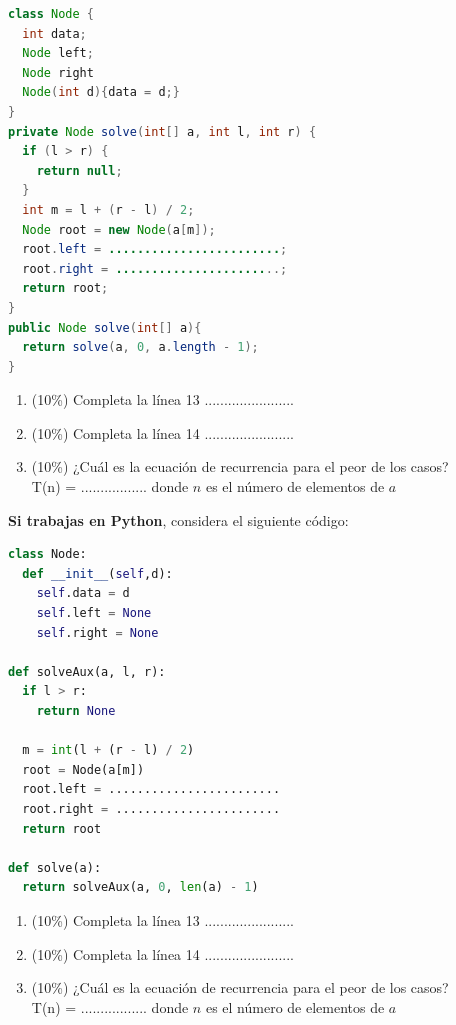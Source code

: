 \documentclass[10 pt]{article}
\begin{document}
\begin{lstlisting}[language=java]
class Node {
  int data;
  Node left;
  Node right
  Node(int d){data = d;}
}
private Node solve(int[] a, int l, int r) {
  if (l > r) {
    return null;
  }
  int m = l + (r - l) / 2;
  Node root = new Node(a[m]);
  root.left = ........................;
  root.right = .......................;
  return root;
}
public Node solve(int[] a){
  return solve(a, 0, a.length - 1);
}
\end{lstlisting}

\begin{enumerate}[label=(\Alph*)]
\item (10\%) Completa la línea 13 .......................
\item (10\%) Completa la línea 14 .......................
\item (10\%) ¿Cuál es la ecuación de recurrencia para el peor de los casos? \\
T(n) = ................. donde $n$ es el número de elementos de $a$

\end{enumerate}

\newpage

\textbf{Si trabajas en Python}, considera el siguiente código:

\begin{lstlisting}[language=python]
class Node:
  def __init__(self,d):
    self.data = d
    self.left = None
    self.right = None

def solveAux(a, l, r):
  if l > r:
    return None
  
  m = int(l + (r - l) / 2)
  root = Node(a[m])
  root.left = ........................
  root.right = .......................
  return root

def solve(a):
  return solveAux(a, 0, len(a) - 1)
\end{lstlisting}

\begin{enumerate}[label=(\Alph*)]
\item (10\%) Completa la línea 13 .......................
\item (10\%) Completa la línea 14 .......................
\item (10\%) ¿Cuál es la ecuación de recurrencia para el peor de los casos? \\
T(n) = ................. donde $n$ es el número de elementos de $a$
\end{enumerate}
\end{document}
